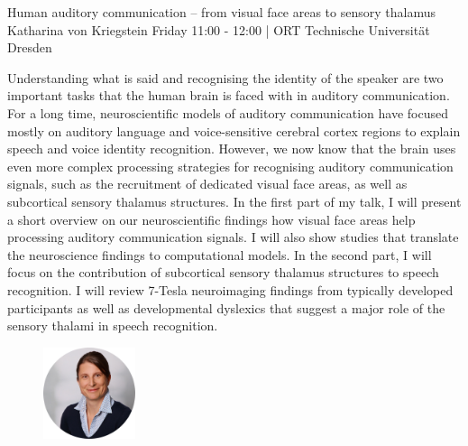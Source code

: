 
\begin{keynote}
    {Human auditory communication – from visual face areas to sensory thalamus}
    {Katharina von Kriegstein}
    {Friday 11:00 - 12:00 | ORT}
    {Technische Universität Dresden}

    Understanding what is said and recognising the identity of the speaker are two important tasks that the human brain is faced with in auditory communication. For a long time, neuroscientific models of auditory communication have focused mostly on auditory language and voice-sensitive cerebral cortex regions to explain speech and voice identity recognition. However, we now know that the brain uses even more complex processing strategies for recognising auditory communication signals, such as the recruitment of dedicated visual face areas, as well as subcortical sensory thalamus structures. In the first part of my talk, I will present a short overview on our neuroscientific findings how visual face areas help processing auditory communication signals. I will also show studies that translate the neuroscience findings to computational models. In the second part, I will focus on the contribution of subcortical sensory thalamus structures to speech recognition. I will review 7-Tesla neuroimaging findings from typically developed participants as well as developmental dyslexics that suggest a major role of the sensory thalami in speech recognition.

    \vspace*{1cm}

    \begin{figure}[H]
        \raggedleft
        \includegraphics[width=0.24\textwidth]{tex/images/keynote_speaker/kriegstein_cropped.png}
    \end{figure}

\end{keynote}
